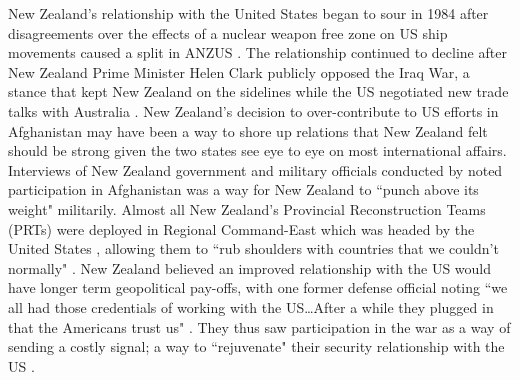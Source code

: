 \documentclass[12pt,letterpaper]{article}
\begin{document}
		New Zealand's relationship with the United States began to sour in 1984 after disagreements over the effects of a nuclear weapon free zone on US ship movements caused a split in ANZUS \citep{catalinac_whynewzealand_2010}. The relationship continued to decline after New Zealand Prime Minister Helen Clark publicly opposed the Iraq War, a stance that kept New Zealand on the sidelines while the US negotiated new trade talks with Australia \citep{armstrong_alliesrewardedtrade_2003}. New Zealand's decision to over-contribute to US efforts in Afghanistan may have been a way to shore up relations that New Zealand felt should be strong given the two states see eye to eye on most international affairs. Interviews of New Zealand government and military officials conducted by \citet{wellings_narrativealignmentmisalignment_2018} noted participation in Afghanistan was a way for New Zealand to ``punch above its weight" militarily. Almost all New Zealand's Provincial Reconstruction Teams (PRTs) were deployed in Regional Command-East which was headed by the United States \citep[49]{auerswald_natoafghanistanfighting_2014}, allowing them to ``rub shoulders with countries that we couldn't normally" \citep{wellings_narrativealignmentmisalignment_2018}. New Zealand believed an improved relationship with the US would have longer term geopolitical pay-offs, with one former defense official noting ``we all had those credentials of working with the US\ldots After a while they plugged in that the Americans trust us" \citep[31]{wellings_narrativealignmentmisalignment_2018}. They thus saw participation in the war as a way of sending a costly signal; a way to ``rejuvenate" their security relationship with the US \citep[128]{burton_natodurabilitypostcold_2018}.
	
\end{document}

